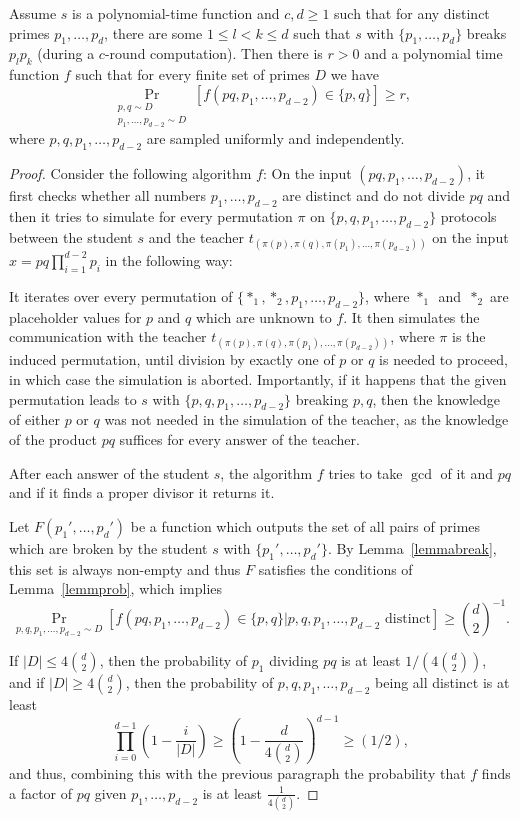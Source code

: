 \documentclass{lmcs}
\newcommand{\abs}[1]{\lvert #1\rvert}
\begin{document}
\begin{thm}\label{thrmmain}
    Assume $s$ is a polynomial-time function and $c,d\geq 1$ such that for any distinct primes $p_1,\dots,p_d$, there are some $1\leq l <k \leq d$ such that $s$ with $\{p_1,\dots,p_d\}$ breaks $p_lp_k$ (during a $c$-round computation). 
    Then there is $r>0$ and a polynomial time function $f$ such that for every finite set of primes $D$ we have
    \[\Pr_{\substack{p,q \sim D\\ p_1,\dots,p_{d-2} \sim D}}  \left[f(pq,p_1,\dots,p_{d-2}) \in \{p,q\}\right]\geq r,\]
    where $p,q,p_1,\dots,p_{d-2}$ are sampled uniformly and independently.
\end{thm}
\begin{proof}


    Consider the following algorithm $f$: On the input $(pq,p_1,\dots,p_{d-2})$, it first checks whether all numbers $p_1,\dots,p_{d-2}$ are distinct and do not divide $pq$ and then it tries to simulate for every permutation $\pi$ on $\{p,q,p_1,\dots,p_{d-2}\}$ protocols between the student $s$ and the teacher $t_{(\pi(p),\pi(q),\pi(p_1),\dots,\pi(p_{d-2}))}$ on the input $x=pq\prod_{i=1}^{d-2}p_i$ in the following way:
        
        It iterates over every permutation of $\{*_1,*_2, p_1,\dots,p_{d-2}\}$, where $*_1$~and~$*_2$ are placeholder values for $p$ and $q$ which are unknown to $f$. It then simulates the communication with the teacher $t_{(\pi(p),\pi(q),\pi(p_1),\dots,\pi(p_{d-2}))}$, where $\pi$ is the induced permutation, until division by exactly one of $p$ or $q$ is needed to proceed, in which case the simulation is aborted. Importantly, if it happens that the given permutation leads to $s$ with $\{p,q,p_1,\dots,p_{d-2}\}$ breaking $p,q$, then the knowledge of either $p$ or $q$ was not needed in the simulation of the teacher, as the knowledge of the product $pq$ suffices for every answer of the teacher. 
        
        After each answer of the student $s$, the algorithm $f$ tries to take $\gcd$ of it and $pq$ and if it finds a proper divisor it returns it.

    Let $F(p_1',\dots,p_d')$ be a function which outputs the set of all pairs of primes which are broken by the student $s$ with $\{p_1',\dots,p_d'\}$. By Lemma~\ref{lemmabreak}, this set is always non-empty and thus $F$ satisfies the conditions of Lemma~\ref{lemmprob}, which implies 
    \[\Pr_{p,q,p_1,\dots,p_{d-2}\sim D}[f(pq,p_1,\dots,p_{d-2})\in\{p,q\}|p,q,p_1,\dots,p_{d-2}\text{ distinct}]\geq \binom{d}{2}^{-1}.\]

    If $\abs{D}\leq 4 \binom{d}{2}$, then the probability of $p_1$ dividing $pq$ is at least $1/(4\binom{d}{2})$, and if $\abs{D}\geq 4\binom{d}{2}$, then the probability of $p,q,p_1,\dots,p_{d-2}$ being all distinct is at least \[\prod_{i=0}^{d-1} \left(1-\frac{i}{\abs{D}}\right ) \geq \left(1- \frac{d}{4 \binom{d}{2}}\right)^{d-1} \geq (1/2),\]
    and thus, combining this with the previous paragraph the probability that $f$ finds a factor of $pq$ given $p_1,\dots, p_{d-2}$ is at least $\frac{1}{4\binom{d}{2}}$.
\end{proof}
\end{document}
